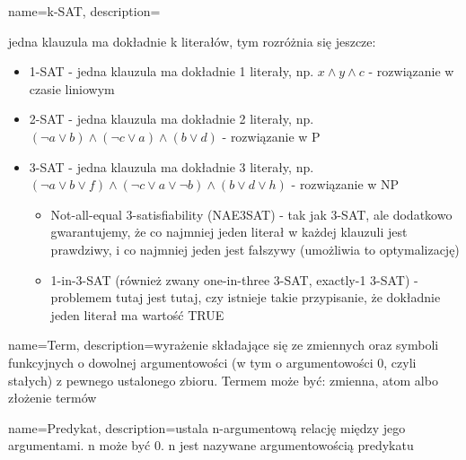  {
    name=k-SAT,
    description={jedna klauzula ma dokładnie k literałów, tym rozróżnia się jeszcze:
\begin{itemize}
    \item 1-SAT - jedna klauzula ma dokładnie 1 literały, np. $x \land y\land c$ - rozwiązanie w czasie liniowym
    \item 2-SAT - jedna klauzula ma dokładnie 2 literały, np. $(\neg a\lor b)\land (\neg c\lor a)\land (b\lor d)$ - rozwiązanie w P
    \item 3-SAT - jedna klauzula ma dokładnie 3 literały, np. $(\neg a\lor b\lor f)\land (\neg c\lor a\lor \neg b)\land (b\lor d\lor h)$ - rozwiązanie w NP 
    \begin{itemize}
    \item Not-all-equal 3-satisfiability (NAE3SAT) - tak jak 3-SAT, ale dodatkowo gwarantujemy, że co najmniej jeden literał w każdej klauzuli jest prawdziwy, i co najmniej jeden jest fałszywy (umożliwia to optymalizację)
    \item 1-in-3-SAT (również zwany one-in-three 3-SAT, exactly-1 3-SAT) - problemem tutaj jest tutaj, czy istnieje takie przypisanie, że dokładnie jeden literał ma wartość TRUE
    \end{itemize}
\end{itemize}
    }
}

 {
    name=Term,
    description={wyrażenie składające się ze zmiennych oraz symboli
    funkcyjnych o dowolnej argumentowości (w tym o argumentowości 0, czyli
    stałych) z pewnego ustalonego zbioru. Termem może być: zmienna, atom albo
    złożenie termów}
}

 {
    name=Predykat,
    description={ustala n-argumentową relację między jego argumentami. n może być 0. n jest nazywane argumentowością predykatu}
}


%
%

